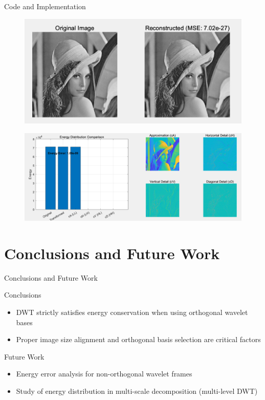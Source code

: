 \documentclass[11pt]{beamer}
\begin{document}
\begin{frame}{Code and Implementation}
  \begin{figure}
      \centering
      \includegraphics[width=0.5\linewidth]{图像1.png}
      
      \label{fig:placeholder}
  \end{figure}

  \begin{figure}
      \centering
      \includegraphics[width=0.75\linewidth]{图片4.jpg}
      
      \label{fig:placeholder}
  \end{figure}
\end{frame}

\section{Conclusions and Future Work}
\begin{frame}{Conclusions and Future Work}
 \begin{block}{Conclusions}
    \begin{itemize}
      \item DWT strictly satisfies energy conservation when using orthogonal wavelet bases  
      \item Proper image size alignment and orthogonal basis selection are critical factors  
      \end{itemize}
      \end{block}
      \begin{block}{Future Work}
    \begin{itemize}
      \item Energy error analysis for non-orthogonal wavelet frames  
      \item Study of energy distribution in multi-scale decomposition (multi-level DWT)   
      \end{itemize}
      \end{block}
    
\end{frame}
\end{document}
